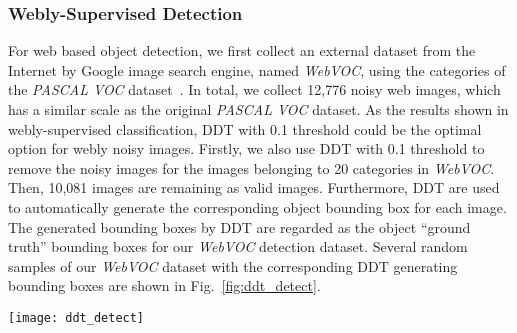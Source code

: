 \documentclass[twocolumn]{svjour3}          \smartqed  \usepackage{graphicx}
\begin{document}
\subsubsection{Webly-Supervised Detection}

For web based object detection, we first collect an external dataset from the Internet by Google image search engine, named \emph{WebVOC}, using the categories of the \emph{PASCAL VOC} dataset~\citep{voc2015}. In total, we collect 12,776 noisy web images, which has a similar scale as the original \emph{PASCAL VOC} dataset. As the results shown in webly-supervised classification, DDT with 0.1 threshold could be the optimal option for webly noisy images. Firstly, we also use DDT with 0.1 threshold to remove the noisy images for the images belonging to 20 categories in \emph{WebVOC}. Then, 10,081 images are remaining as valid images. Furthermore, DDT are used to automatically generate the corresponding object bounding box for each image. The generated bounding boxes by DDT are regarded as the object ``ground truth'' bounding boxes for our \emph{WebVOC} detection dataset. Several random samples of our \emph{WebVOC} dataset with the corresponding DDT generating bounding boxes are shown in Fig.~\ref{fig:ddt_detect}.

\begin{figure*}[t]	
 \centering
 \texttt{[image: ddt\_detect]}
 \caption{Examples of our \emph{WebVOC} detection dataset. The red bounding boxes in these figures are automatically labeled by the proposed DDT method. (Best viewed in color and zoomed in.)}
 \label{fig:ddt_detect}
\end{figure*}
\end{document}

